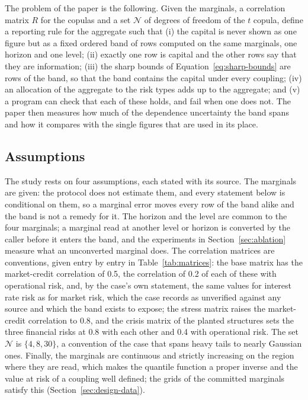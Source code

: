 The problem of the paper is the following. Given the marginals, a correlation matrix $R$ for the copulas and a set $\mathcal N$ of
degrees of freedom of the $t$ copula, define a reporting rule for the aggregate such that (i) the capital is never shown as one
figure but as a fixed ordered band of rows computed on the same marginals, one horizon and one level; (ii) exactly one row is
capital and the other rows say that they are information; (iii) the sharp bounds of Equation~\ref{eq:sharp-bounds} are rows of the
band, so that the band contains the capital under every coupling; (iv) an allocation of the aggregate to the risk types adds up to
the aggregate; and (v) a program can check that each of these holds, and fail when one does not. The paper then measures how much
of the dependence uncertainty the band spans and how it compares with the single figures that are used in its place.

\subsection{Assumptions}
\label{sec:problem-assumptions}

The study rests on four assumptions, each stated with its source. The marginals are given: the protocol does not estimate them,
and every statement below is conditional on them, so a marginal error moves every row of the band alike and the band is not a
remedy for it. The horizon and the level are common to the four marginals; a marginal read at another level or horizon is
converted by the caller before it enters the band, and the experiments in Section~\ref{sec:ablation} measure what an unconverted
marginal does. The correlation matrices are conventions, given entry by entry in Table~\ref{tab:matrices}: the base matrix has the
market-credit correlation of 0.5, the correlation of 0.2 of each of these with operational risk, and, by the case's own statement,
the same values for interest rate risk as for market risk, which the case records as unverified against any source and which the
band exists to expose; the stress matrix raises the market-credit correlation to 0.8, and the crisis matrix of the planted
structures sets the three financial risks at 0.8 with each other and 0.4 with operational risk. The set $\mathcal N$ is $\{4,8,30\}$, a convention of the case that spans heavy tails to nearly Gaussian ones.
Finally, the marginals are continuous and strictly increasing on the region where they are read, which makes the quantile
function a proper inverse and the value at risk of a coupling well defined; the grids of the committed marginals satisfy this
(Section~\ref{sec:design-data}).


